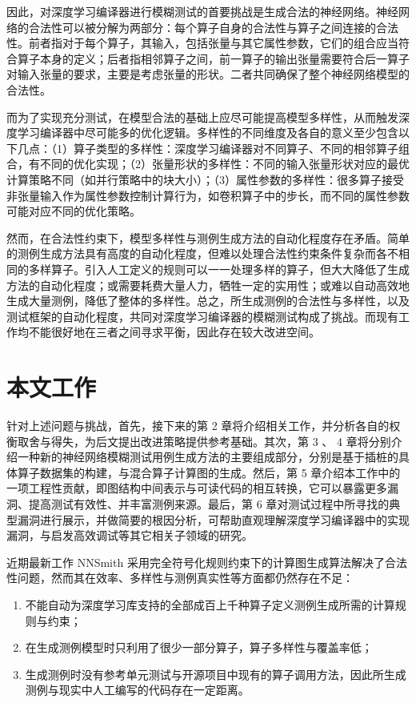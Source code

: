 因此，对深度学习编译器进行模糊测试的首要挑战是生成合法的神经网络。神经网络的合法性可以被分解为两部分：每个算子自身的合法性与算子之间连接的合法性。前者指对于每个算子，其输入，包括张量与其它属性参数，它们的组合应当符合算子本身的定义；后者指相邻算子之间，前一算子的输出张量需要符合后一算子对输入张量的要求，主要是考虑张量的形状。二者共同确保了整个神经网络模型的合法性。

而为了实现充分测试，在模型合法的基础上应尽可能提高模型多样性，从而触发深度学习编译器中尽可能多的优化逻辑。多样性的不同维度及各自的意义至少包含以下几点：（1）算子类型的多样性：深度学习编译器对不同算子、不同的相邻算子组合，有不同的优化实现；（2）张量形状的多样性：不同的输入张量形状对应的最优计算策略不同（如并行策略中的块大小）；（3）属性参数的多样性：很多算子接受非张量输入作为属性参数控制计算行为，如卷积算子中的步长，而不同的属性参数可能对应不同的优化策略。

然而，在合法性约束下，模型多样性与测例生成方法的自动化程度存在矛盾。简单的测例生成方法具有高度的自动化程度，但难以处理合法性约束条件复杂而各不相同的多样算子。引入人工定义的规则可以一一处理多样的算子，但大大降低了生成方法的自动化程度；或需要耗费大量人力，牺牲一定的实用性；或难以自动高效地生成大量测例，降低了整体的多样性。总之，所生成测例的合法性与多样性，以及测试框架的自动化程度，共同对深度学习编译器的模糊测试构成了挑战。而现有工作均不能很好地在三者之间寻求平衡，因此存在较大改进空间。

\section{本文工作}
针对上述问题与挑战，首先，接下来的第 2 章将介绍相关工作，并分析各自的权衡取舍与得失，为后文提出改进策略提供参考基础。其次，第 3 、 4 章将分别介绍一种新的神经网络模糊测试用例生成方法的主要组成部分，分别是基于插桩的具体算子数据集的构建，与混合算子计算图的生成。然后，第 5 章介绍本工作中的一项工程性贡献，即图结构中间表示与可读代码的相互转换，它可以暴露更多漏洞、提高测试有效性、并丰富测例来源。最后，第 6 章对测试过程中所寻找的典型漏洞进行展示，并做简要的根因分析，可帮助直观理解深度学习编译器中的实现漏洞，与启发高效调试等其它相关子领域的研究。

\iffalse

近期最新工作 NNSmith 采用完全符号化规则约束下的计算图生成算法解决了合法性问题，然而其在效率、多样性与测例真实性等方面都仍然存在不足：
\begin{enumerate}
    \item 不能自动为深度学习库支持的全部成百上千种算子定义测例生成所需的计算规则与约束；
    \item 在生成测例模型时只利用了很少一部分算子，算子多样性与覆盖率低；
    \item 生成测例时没有参考单元测试与开源项目中现有的算子调用方法，因此所生成测例与现实中人工编写的代码存在一定距离。
\end{enumerate}


